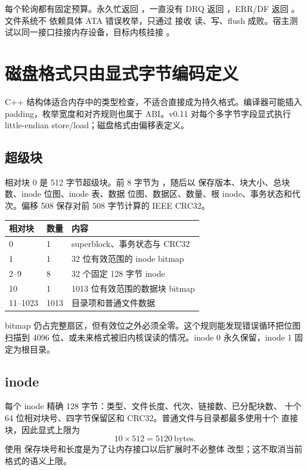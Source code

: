 每个轮询都有固定预算。永久忙返回 ，一直没有 DRQ 返回
，ERR/DF 返回 。文件系统不
依赖具体 ATA 错误枚举，只通过  接收
读、写、flush 成败。宿主测试以同一接口挂接内存设备，目标内核挂接
。

\section{磁盘格式只由显式字节编码定义}

C++ 结构体适合内存中的类型检查，不适合直接成为持久格式。编译器可能插入
padding，枚举宽度和对齐规则也属于 ABI。v0.11 对每个多字节字段显式执行
little-endian store/load；磁盘格式由偏移表定义。

\subsection{超级块}

相对块 0 是 512 字节超级块。前 8 字节为 ，随后以
 保存版本、块大小、总块数、inode 位图、inode 表、数据
位图、数据区、数量、根 inode、事务状态和代次。偏移 508 保存对前 508
字节计算的 IEEE CRC32。

\begin{longtable}{L{0.17\textwidth}L{0.18\textwidth}L{0.53\textwidth}}
\toprule
相对块 & 数量 & 内容\\
 & 1 & superblock、事务状态与 CRC32\\
1 & 1 & 32 位有效范围的 inode bitmap\\
2--9 & 8 & 32 个固定 128 字节 inode\\
10 & 1 & 1013 位有效范围的数据块 bitmap\\
11--1023 & 1013 & 目录项和普通文件数据\\
\bottomrule
\end{longtable}

bitmap 仍占完整扇区，但有效位之外必须全零。这个规则能发现错误循环把位图
扫描到 4096 位、或未来格式被旧内核误读的情况。inode 0 永久保留，inode 1
固定为根目录。

\subsection{inode}

每个 inode 精确 128 字节：类型、文件长度、代次、链接数、已分配块数、
十个 64 位相对块号、四字节保留区和 CRC32。普通文件与目录都最多使用十个
直接块，因此显式上限为
\[
  10\times512=5120\ \text{bytes}.
\]
使用  保存块号和长度是为了让内存接口以后扩展时不必整体
改型；这不取消当前格式的语义上限。

